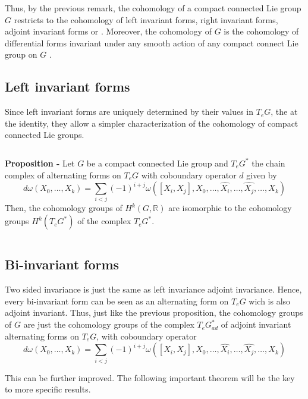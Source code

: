 \documentclass[12pt]{article}
\begin{document}
Thus, by the previous remark, the cohomology of a compact connected Lie group $G$ restricts to the cohomology of left invariant forms, right invariant forms, adjoint invariant forms or . Moreover, the cohomology of $G$ is the cohomology of differential forms invariant under any smooth action of any compact connect Lie group on $G$ .

\subsection{Left invariant forms}

Since left invariant forms are uniquely determined by their values in $T_eG$, the  at the identity, they allow a simpler characterization of the cohomology of compact connected Lie groups.

$\,$

{\bf Proposition -} Let $G$ be a compact connected Lie group and $T_eG^*$ the chain complex of alternating forms on $T_eG$ with coboundary operator $d$ given by
\begin{displaymath}
d\omega (X_0, \dots , X_k) = \sum_{i<j} (-1)^{i+j} \omega([X_i, X_j], X_0, \dots, \hat{X_i}, \dots, \hat{X_j}, \dots, X_k)
\end{displaymath}
Then, the cohomology groups of $H^k(G, \mathbb{R})$ are isomorphic to the cohomology groups $H^k(T_eG^*)$ of the complex $T_eG^*$.

$\,$

\subsection{Bi-invariant forms}
Two sided invariance is just the same as left invariance  adjoint invariance. Hence, every bi-invariant form can be seen as an alternating form on $T_eG$ wich is also adjoint invariant. Thus, just like the previous proposition, the cohomology groups of $G$ are just the cohomology groups of the complex $T_eG^*_{ad}$ of adjoint invariant alternating forms on $T_eG$, with coboundary operator
\begin{displaymath}
d\omega (X_0, \dots , X_k) = \sum_{i<j} (-1)^{i+j} \omega([X_i, X_j], X_0, \dots, \hat{X_i}, \dots, \hat{X_j}, \dots, X_k)
\end{displaymath}

This can be further improved. The following important theorem will be the key to more specific results.
\end{document}
